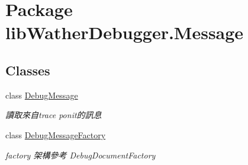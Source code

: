 \hypertarget{namespacelib_wather_debugger_1_1_message}{\section{Package lib\+Wather\+Debugger.\+Message}
\label{namespacelib_wather_debugger_1_1_message}
}
\subsection*{Classes}
\begin{DoxyCompactItemize}
\item 
class \hyperlink{classlib_wather_debugger_1_1_message_1_1_debug_message}{Debug\+Message}
\begin{DoxyCompactList}\small\item\em 讀取來自trace ponit的訊息 \end{DoxyCompactList}\item 
class \hyperlink{classlib_wather_debugger_1_1_message_1_1_debug_message_factory}{Debug\+Message\+Factory}
\begin{DoxyCompactList}\small\item\em factory 架構參考 Debug\+Document\+Factory \end{DoxyCompactList}\end{DoxyCompactItemize}
